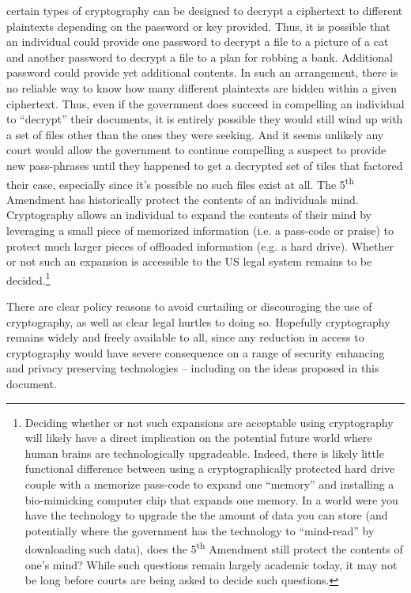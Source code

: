 \begin{packed_desc}
  certain types of cryptography can be designed to decrypt a
  ciphertext to different plaintexts depending on the password or key
  provided. Thus, it is possible that an individual could provide one
  password to decrypt a file to a picture of a cat and another
  password to decrypt a file to a plan for robbing a bank. Additional
  password could provide yet additional contents. In such an
  arrangement, there is no reliable way to know how many different
  plaintexts are hidden within a given ciphertext. Thus, even if the
  government does succeed in compelling an individual to ``decrypt''
  their documents, it is entirely possible they would still wind up
  with a set of files other than the ones they were seeking. And it
  seems unlikely any court would allow the government to continue
  compelling a suspect to provide new pass-phrases until they happened
  to get a decrypted set of tiles that factored their case, especially
  since it's possible no such files exist at all. The
  5\textsuperscript{th} Amendment has historically protect the
  contents of an individuals mind. Cryptography allows an individual
  to expand the contents of their mind by leveraging a small piece of
  memorized information (i.e. a pass-code or praise) to protect much
  larger pieces of offloaded information (e.g. a hard drive). Whether
  or not such an expansion is accessible to the US legal system
  remains to be decided.\footnote{Deciding whether or not such
    expansions are acceptable using cryptography will likely have a
    direct implication on the potential future world where human
    brains are technologically upgradeable. Indeed, there is likely
    little functional difference between using a cryptographically
    protected hard drive couple with a memorize pass-code to expand
    one ``memory'' and installing a bio-mimicking computer chip that
    expands one memory. In a world were you have the technology to
    upgrade the the amount of data you can store (and potentially
    where the government has the technology to ``mind-read'' by
    downloading such data), does the 5\textsuperscript{th} Amendment
    still protect the contents of one's mind? While such questions
    remain largely academic today, it may not be long before courts
    are being asked to decide such questions.}
\end{packed_desc}

There are clear policy reasons to avoid curtailing or discouraging the
use of cryptography, as well as clear legal hurtles to doing
so. Hopefully cryptography remains widely and freely available to all,
since any reduction in access to cryptography would have severe
consequence on a range of security enhancing and privacy preserving
technologies -- including on the ideas proposed in this document.

